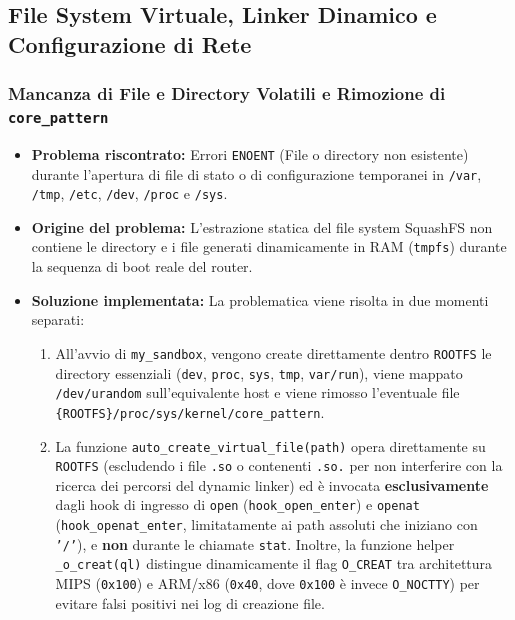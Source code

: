 \documentclass[11pt,a4paper]{article}
\begin{document}
\subsection{File System Virtuale, Linker Dinamico e Configurazione di Rete}

\subsubsection{Mancanza di File e Directory Volatili e Rimozione di \texttt{core\_pattern}}
\begin{itemize}
    \item \textbf{Problema riscontrato:} Errori \texttt{ENOENT} (File o directory non esistente) durante l'apertura di file di stato o di configurazione temporanei in \texttt{/var}, \texttt{/tmp}, \texttt{/etc}, \texttt{/dev}, \texttt{/proc} e \texttt{/sys}.
    \item \textbf{Origine del problema:} L'estrazione statica del file system SquashFS non contiene le directory e i file generati dinamicamente in RAM (\texttt{tmpfs}) durante la sequenza di boot reale del router.
    \item \textbf{Soluzione implementata:} La problematica viene risolta in due momenti separati:
    \begin{enumerate}
        \item All'avvio di \texttt{my\_sandbox}, vengono create direttamente dentro \texttt{ROOTFS} le directory essenziali (\texttt{dev}, \texttt{proc}, \texttt{sys}, \texttt{tmp}, \texttt{var/run}), viene mappato \texttt{/dev/urandom} sull'equivalente host e viene rimosso l'eventuale file \texttt{\{ROOTFS\}/proc/sys/kernel/core\_pattern}.
        \item La funzione \texttt{auto\_create\_virtual\_file(path)} opera direttamente su \texttt{ROOTFS} (escludendo i file \texttt{.so} o contenenti \texttt{.so.} per non interferire con la ricerca dei percorsi del dynamic linker) ed è invocata \textbf{esclusivamente} dagli hook di ingresso di \texttt{open} (\texttt{hook\_open\_enter}) e \texttt{openat} (\texttt{hook\_openat\_enter}, limitatamente ai path assoluti che iniziano con \texttt{'/'}), e \textbf{non} durante le chiamate \texttt{stat}. Inoltre, la funzione helper \texttt{\_o\_creat(ql)} distingue dinamicamente il flag \texttt{O\_CREAT} tra architettura MIPS (\texttt{0x100}) e ARM/x86 (\texttt{0x40}, dove \texttt{0x100} è invece \texttt{O\_NOCTTY}) per evitare falsi positivi nei log di creazione file.
    \end{enumerate}
\end{itemize}
\end{document}
